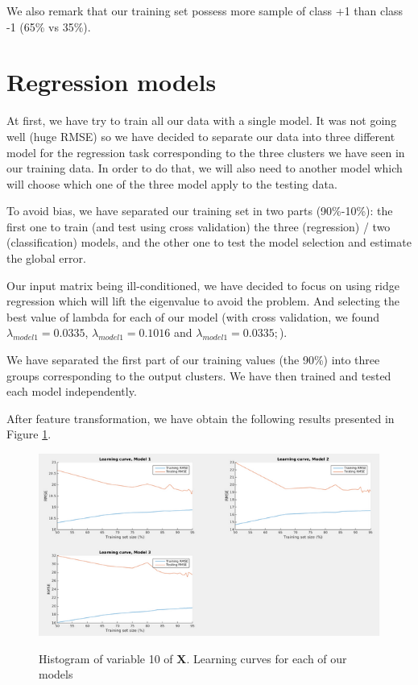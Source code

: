 \documentclass{article} %
\begin{document}
We also remark that our training set possess more sample of class +1 than class -1 (65\% vs 35\%).

\section{Regression models}
At first, we have try to train all our data with a single model. It was not going well (huge RMSE) so we have decided to separate our data into three different model for the regression task corresponding to the three clusters we have seen in our training data. In order to do that, we will also need to another model which will choose which one of the three model apply to the testing data.

To avoid bias, we have separated our training set in two parts (90\%-10\%): the first one to train (and test using cross validation) the three (regression) / two (classification) models, and the other one to test the model selection and estimate the global error.

Our input matrix being ill-conditioned, we have decided to focus on using ridge regression which will lift the eigenvalue to avoid the problem. And selecting the best value of lambda for each of our model (with cross validation, we found $\lambda_{model1} = 0.0335$, $\lambda_{model1} = 0.1016$ and $\lambda_{model1} = 0.0335;$).

We have separated the first part of our training values (the 90\%) into three groups corresponding to the output clusters. We have then trained and tested each model independently.

After feature transformation, we have obtain the following results presented in Figure \ref{fig:learningCurves}.

\begin{figure}[!h]
\center
{\includegraphics{figures/learningCurves.png} \label{fig:learningCurves}}
\caption{Histogram of variable 10 of $\mathbf{X}$. Learning curves for each of our models}
\end{figure}
\end{document}
